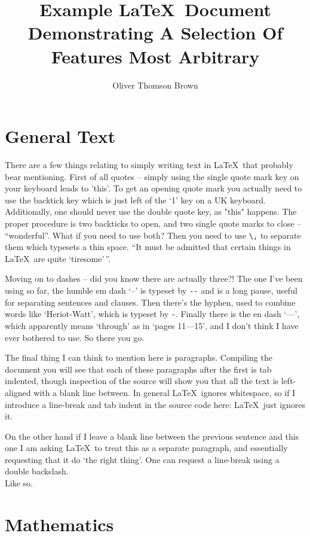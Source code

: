 \documentclass[a4paper,11pt,twoside]{article}		%
\author{Oliver Thomson Brown}
\title{\textbf{Example \LaTeX\ Document} \\ {\Fontamici Demonstrating A Selection Of Features Most Arbitrary}}
\date{}
\begin{document}
\maketitle

\tableofcontents

\section{General Text}

There are a few things relating to simply writing text in \LaTeX\ that probably bear mentioning. First of all quotes -- simply using the single quote mark key on your keyboard leads to 'this'. To get an opening quote mark you actually need to use the backtick key which is just left of the `1' key on a UK keyboard. Additionally, one should never use the double quote key, as "this" happens. The proper procedure is two backticks to open, and two single quote marks to close -- ``wonderful''. What if you need to use both? Then you need to use \verb:\,: to separate them which typesets a thin space. ``It must be admitted that certain things in \LaTeX\ are quite `tiresome'\,''.

Moving on to dashes -- did you know there are actually three?! The one I've been using so far, the humble em dash `--' is typeset by \verb:--: and is a long pause, useful for separating sentences and clauses. Then there's the hyphen, used to combine words like `Heriot-Watt', which is typeset by \verb:-:. Finally there is the en dash `---', which apparently means `through' as in `pages 11---15', and I don't think I have ever bothered to use. So there you go.

The final thing I can think to mention here is paragraphs. Compiling the document you will see that each of these paragraphs after the first is tab indented, though inspection of the source will show you that all the text is left-aligned with a blank line between. In general \LaTeX\ ignores whitespace, so if I introduce a line-break and tab indent in the source code here:
	\LaTeX\ just ignores it.

On the other hand if I leave a blank line between the previous sentence and this one I am asking \LaTeX\ to treat this as a separate paragraph, and essentially requesting that it do `the right thing'. One can request a line-break using a double backslash.\\ Like so. 

\section{Mathematics}
\end{document}
